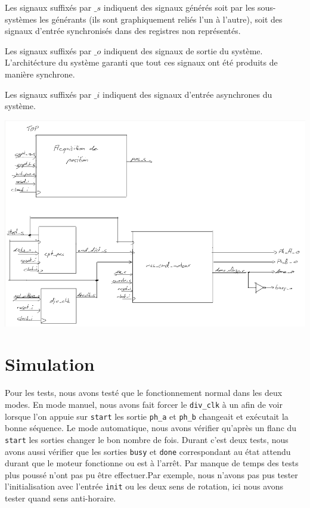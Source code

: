 \documentclass[10pt,a4paper]{article}
\begin{document}
Les signaux suffixés par $\_s$ indiquent des signaux générés soit par les sous-systèmes les générants (ils sont graphiquement reliés l'un à l'autre), soit des signaux d'entrée synchronisés dans des registres non représentés.

Les signaux suffixés par $\_o$ indiquent des signaux de sortie du système.
L'architécture du système garanti que tout ces signaux ont été produits de manière synchrone.

Les signaux suffixés par $\_i$ indiquent des signaux d'entrée asynchrones du système.

\includegraphics[angle=90, width=\textwidth]{images/top.png}

\newpage
\section{Simulation}
Pour les tests, nous avons testé que le fonctionnement normal dans les deux modes. En mode manuel, nous avons fait forcer le \texttt{div\_clk} à un afin de voir lorsque l'on appuie sur \texttt{start} les sortie \texttt{ph\_a} et \texttt{ph\_b} changeait et exécutait la bonne séquence. Le mode automatique, nous avons vérifier qu'après un flanc du \texttt{start} les sorties changer le bon nombre de fois. Durant c'est deux tests, nous avons aussi vérifier que les sorties \texttt{busy} et \texttt{done} correspondant au état attendu durant que le moteur fonctionne ou est à l'arrêt. Par manque de temps des tests plus poussé n'ont pas pu être effectuer.Par exemple, nous n'avons pas pus tester l'initialisation avec l'entrée \texttt{init} ou les deux sens de rotation, ici nous avons tester quand sens anti-horaire.\\
\end{document}
